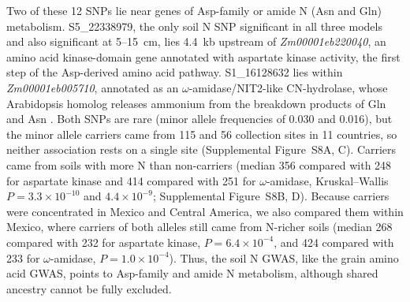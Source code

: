 \documentclass[namedate,unnumsec,webpdf,contemporary,large]{oup-authoring-template}
\begin{document}
Two of these 12 SNPs lie near genes of Asp-family or amide N (Asn and Gln) metabolism. S5\_22338979, the only soil N SNP significant in all three models and also significant at 5--15~cm, lies 4.4~kb upstream of \textit{Zm00001eb220040}, an amino acid kinase-domain gene annotated with aspartate kinase activity, the first step of the Asp-derived amino acid pathway. S1\_16128632 lies within \textit{Zm00001eb005710}, annotated as an $\omega$-amidase/NIT2-like CN-hydrolase, whose Arabidopsis homolog releases ammonium from the breakdown products of Gln and Asn \citep{Zhang2014OmegaAmidase}. Both SNPs are rare (minor allele frequencies of 0.030 and 0.016), but the minor allele carriers came from 115 and 56 collection sites in 11 countries, so neither association rests on a single site (Supplemental Figure~S8A, C). Carriers came from soils with more N than non-carriers (median 356 compared with 248 for aspartate kinase and 414 compared with 251 for $\omega$-amidase, Kruskal--Wallis $P = 3.3 \times 10^{-10}$ and $4.4 \times 10^{-9}$; Supplemental Figure~S8B, D). Because carriers were concentrated in Mexico and Central America, we also compared them within Mexico, where carriers of both alleles still came from N-richer soils (median 268 compared with 232 for aspartate kinase, $P = 6.4 \times 10^{-4}$, and 424 compared with 233 for $\omega$-amidase, $P = 1.0 \times 10^{-4}$). Thus, the soil N GWAS, like the grain amino acid GWAS, points to Asp-family and amide N metabolism, although shared ancestry cannot be fully excluded.
\end{document}
